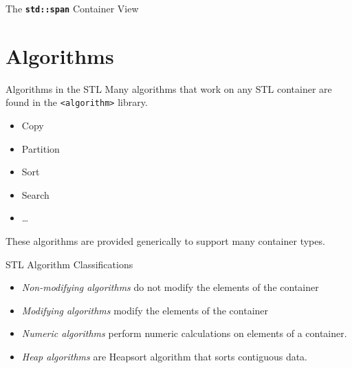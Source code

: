\documentclass[14pt,aspectratio=1610]{beamer}
\begin{document}
\begin{frame}{The \texttt{\textbf{std::span}} Container View}
\begin{tikzpicture}
  \end{tikzpicture}
\end{frame}

\section{Algorithms}

\begin{frame}{Algorithms in the STL}
Many algorithms that work on any STL container are \\
found in the \lstinline{<algorithm>} library.
\begin{itemize}
\item
  Copy
\item
  Partition
\item
  Sort
\item
  Search
\item
  \ldots{}
\end{itemize}

These algorithms are provided generically to support many container types.
\end{frame}


\begin{frame}{STL Algorithm Classifications}

\begin{itemize}
\item
  \emph{Non-modifying algorithms} do not modify the elements of the container
\item
  \emph{Modifying algorithms} modify the elements of the container
\item
  \emph{Numeric algorithms} perform numeric calculations on elements of a container.
\item
  \emph{Heap algorithms} are Heapsort algorithm that sorts contiguous data.
\end{itemize}
\end{frame}
\end{document}
